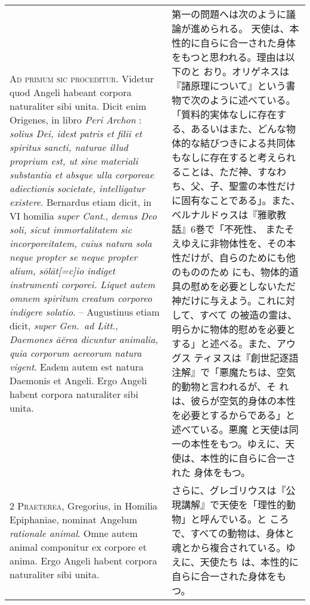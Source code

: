 \documentclass[10pt]{jsarticle} %
\begin{document}
\begin{longtable}{p{21em}p{21em}}


{\huge A}{\scshape d primum sic proceditur}. Videtur quod
Angeli habeant corpora naturaliter sibi unita. Dicit enim Origenes, in
libro {\itshape Peri Archon} : {\itshape solius Dei, idest patris et filii et spiritus sancti,
naturae illud proprium est, ut sine materiali substantia et absque ulla
corporeae adiectionis societate, intelligatur existere}. Bernardus etiam
dicit, in VI homilia {\itshape super Cant}., {\itshape demus Deo soli, sicut immortalitatem
sic incorporeitatem, cuius natura sola neque propter se neque propter
alium, s\={o}l\={a}t[=c]io indiget instrumenti corporei. Liquet autem omnem spiritum
creatum corporeo indigere solatio}. -- Augustinus etiam dicit, {\itshape
 super Gen.~ad Litt}., {\itshape Daemones \={a}\u{e}rea dicuntur animalia, quia corporum aereorum natura
vigent}. Eadem autem est natura Daemonis et Angeli. Ergo Angeli habent
corpora naturaliter sibi unita.


&
第一の問題へは次のように議論が進められる。
天使は、本性的に自らに合一された身体をもつと思われる。理由は以下のと
 おり。オリゲネスは『諸原理について』という書物で次のように述べている。
 「質料的実体なしに存在する、あるいはまた、どんな物体的な結びつきによる共同体もなしに存在すると考えられることは、ただ神、すなわち、父、子、聖霊の本性だけ
 に固有なことである」。また、ベルナルドゥスは『雅歌教話』6巻で「不死性、
 またそえゆえに非物体性を、その本性だけが、自らのためにも他のもののため
 にも、物体的道具の慰めを必要としないただ神だけに与えよう。これに対して、すべて
 の被造の霊は、明らかに物体的慰めを必要とする」と述べる。また、アウグス
 ティヌスは『創世記逐語注解』で「悪魔たちは、空気的動物と言われるが、そ
 れは、彼らが空気的身体の本性を必要とするからである」と述べている。悪魔
 と天使は同一の本性をもつ。ゆえに、天使は、本性的に自らに合一された
 身体をもつ。

\\


{\scshape 2 Praeterea}, Gregorius, in Homilia
Epiphaniae, nominat Angelum {\itshape rationale animal}. Omne autem animal
componitur ex corpore et anima. Ergo Angeli habent corpora naturaliter
sibi unita.


&

さらに、グレゴリウスは『公現講解』で天使を「理性的動物」と呼んでいる。と
 ころで、すべての動物は、身体と魂とから複合されている。ゆえに、天使たち
 は、本性的に自らに合一された身体をもつ。


\\



\end{longtable}
\end{document}
